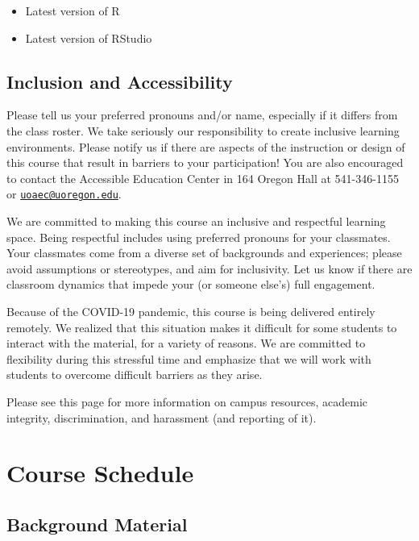 \documentclass[
]{book}
\begin{document}
\begin{itemize}
\item
  Latest version of R
\item
  Latest version of RStudio
\end{itemize}

\hypertarget{inclusion-and-accessibility}{%
\section{Inclusion and Accessibility}\label{inclusion-and-accessibility}}

Please tell us your preferred pronouns and/or name, especially if it differs from the class roster. We take seriously our responsibility to create inclusive learning environments. Please notify us if there are aspects of the instruction or design of this course that result in barriers to your participation! You are also encouraged to contact the Accessible Education Center in 164 Oregon Hall at 541-346-1155 or \href{mailto:uoaec@uoregon.edu}{\nolinkurl{uoaec@uoregon.edu}}.

We are committed to making this course an inclusive and respectful learning space. Being respectful includes using preferred pronouns for your classmates. Your classmates come from a diverse set of backgrounds and experiences; please avoid assumptions or stereotypes, and aim for inclusivity. Let us know if there are classroom dynamics that impede your (or someone else's) full engagement.

Because of the COVID-19 pandemic, this course is being delivered entirely remotely. We realized that this situation makes it difficult for some students to interact with the material, for a variety of reasons. We are committed to flexibility during this stressful time and emphasize that we will work with students to overcome difficult barriers as they arise.

Please see this page for more information on campus resources, academic integrity, discrimination, and harassment (and reporting of it).

\hypertarget{course-schedule}{%
\chapter{Course Schedule}\label{course-schedule}}

\hypertarget{background-material}{%
\section{Background Material}\label{background-material}}
\end{document}
